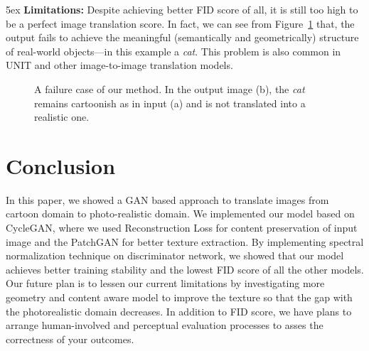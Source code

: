 \documentclass[runningheads]{llncs}
\begin{document}
\parindent 5ex \textbf{Limitations:} Despite achieving better FID score of all, it is still too high to be a perfect image translation score. In fact, we can see from Figure~\ref{fig:limitation} that, the output fails to achieve the meaningful (semantically and geometrically) structure of real-world objects---in this example a \textit{cat}. This problem is also common in UNIT\cite{DBLP:journals/corr/LiuBK17} and other image-to-image translation models.
\begin{figure}[!htb]
\centering     %
{}
\hspace{0.1in}
\caption{A failure case of our method. In the output image (b), the \textit{cat} remains cartoonish as in input (a) and is not translated into a realistic one.}
\label{fig:limitation}
\end{figure}

\section{Conclusion}

In this paper, we showed a GAN based approach to translate images from cartoon domain to photo-realistic domain. We implemented our model based on CycleGAN\cite{DBLP:conf/iccv/ZhuPIE17}, where we used Reconstruction Loss for content preservation of input image and the PatchGAN for better texture extraction. By implementing spectral normalization technique on discriminator network, we showed that our model achieves better training stability and the lowest FID score of all the other models. Our future plan is to lessen our current limitations by investigating more geometry and content aware model to improve the texture so that the gap with the photorealistic domain decreases. In addition to FID score, we have plans to arrange human-involved and perceptual evaluation processes to asses the correctness of your outcomes.

%
%
%


\end{document}
